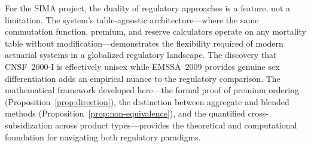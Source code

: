 \documentclass[12pt,a4paper]{article}
\begin{document}
For the SIMA project, the duality of regulatory approaches is a feature, not a
limitation. The system's table-agnostic architecture---where the same commutation
function, premium, and reserve calculators operate on any mortality table without
modification---demonstrates the flexibility required of modern actuarial systems
in a globalized regulatory landscape. The discovery that CNSF~2000-I is effectively
unisex while EMSSA~2009 provides genuine sex differentiation adds an empirical
nuance to the regulatory comparison. The mathematical framework developed here---the
formal proof of premium ordering (Proposition~\ref{prop:direction}), the
distinction between aggregate and blended methods (Proposition~\ref{prop:non-equivalence}),
and the quantified cross-subsidization across product types---provides the
theoretical and computational foundation for navigating both regulatory paradigms.
\end{document}
